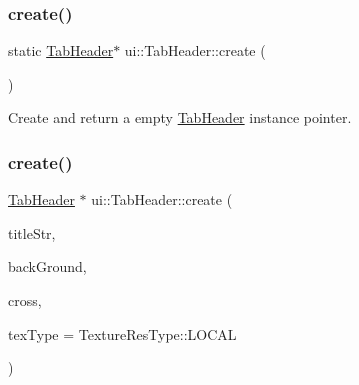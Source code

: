 \subsubsection{\texorpdfstring{create()}{create()}\hspace{0.1cm}{\footnotesize\ttfamily [2/6]}}
{\footnotesize\ttfamily static \hyperlink{classui_1_1TabHeader}{Tab\+Header}$\ast$ ui\+::\+Tab\+Header\+::create (\begin{DoxyParamCaption}{ }\end{DoxyParamCaption})\hspace{0.3cm}{\ttfamily [static]}}

Create and return a empty \hyperlink{classui_1_1TabHeader}{Tab\+Header} instance pointer. \mbox{\label{classui_1_1TabHeader_ae3cbde1e566ae0f49cba73b2b5e891f4}} 
\subsubsection{\texorpdfstring{create()}{create()}\hspace{0.1cm}{\footnotesize\ttfamily [3/6]}}
{\footnotesize\ttfamily \hyperlink{classui_1_1TabHeader}{Tab\+Header} $\ast$ ui\+::\+Tab\+Header\+::create (\begin{DoxyParamCaption}\item[{const std\+::string \&}]{title\+Str,  }\item[{const std\+::string \&}]{back\+Ground,  }\item[{const std\+::string \&}]{cross,  }\item[{\hyperlink{classui_1_1Widget_a040a65ec5ad3b11119b7e16b98bd9af0}{Texture\+Res\+Type}}]{tex\+Type = {\ttfamily TextureResType\+:\+:LOCAL} }\end{DoxyParamCaption})\hspace{0.3cm}{\ttfamily [static]}}

